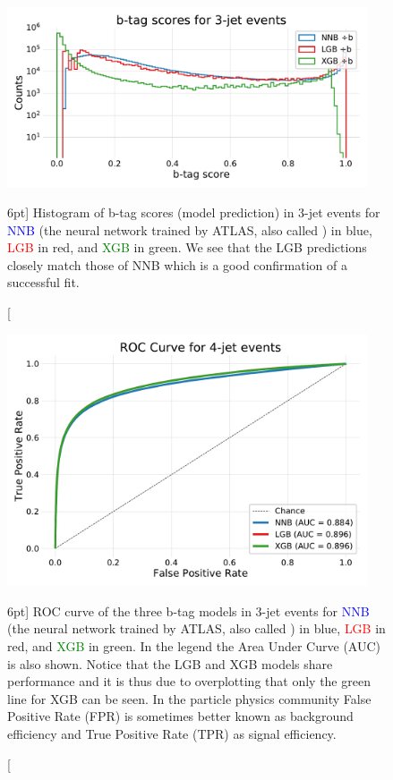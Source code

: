 \documentclass[a4paper, twoside, nobib]{tufte-book}
\newcommand{\code}[1]{\colorbox{light-gray}{\texttt{\detokenize{#1}}}}
\begin{document}
\begin{figure}
  \includegraphics[width=0.95\textwidth, trim=0 0 0 30, clip]{figures/quarks/y_pred_3_jet_hist-down_sample=1.00-ML_vars=vertex-selection=b-ejet_min=4-n_iter_RS_lgb=99-n_iter_RS_xgb=9-cdot_cut=0.90-version=19.pdf}
  \caption[b-tag scores in 3-jet events][6pt]
          {Histogram of b-tag scores (model prediction) in 3-jet events for \textcolor{blue}{NNB} (the neural network trained by ATLAS, also called \code{nnbjet}) in blue, \textcolor{red}{LGB} in red, and \textcolor{green}{XGB} in green. We see that the LGB predictions closely match those of NNB which is a good confirmation of a successful fit.  
          } 
  \label{fig:q:btag_scores_3j}
\end{figure}




\begin{figure}
  \includegraphics[width=0.95\textwidth, trim=10 10 10 40, clip]{figures/quarks/ROC_4_jet-down_sample=1.00-ML_vars=vertex-selection=b-ejet_min=4-n_iter_RS_lgb=99-n_iter_RS_xgb=9-cdot_cut=0.90-version=19.pdf}
  \caption[ROC curve for b-tag in 4-jet events][6pt]
          {ROC curve of the three b-tag models in 3-jet events for \textcolor{blue}{NNB} (the neural network trained by ATLAS, also called \code{nnbjet}) in blue, \textcolor{red}{LGB} in red, and \textcolor{green}{XGB} in green. In the legend the Area Under Curve (AUC) is also shown. Notice that the LGB and XGB models share performance and it is thus due to overplotting that only the green line for XGB can be seen. In the particle physics community False Positive Rate (FPR) is sometimes better known as background efficiency and True Positive Rate (TPR) as signal efficiency.  
          } 
  \label{fig:q:roc_btag_4j}
\end{figure}
\end{document}
